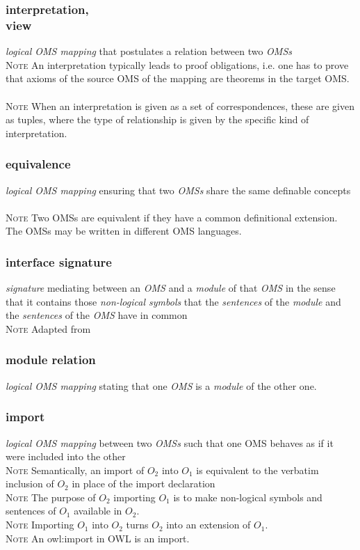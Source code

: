 \documentclass[10pt,%
\ifpretendfinal
final%
\else
draft%
\fi,
]{scrreprt}
\makeatletter
\newcommand*{\ie}{i.e.\@\xspace}
\newcommand*{\termref}[1]{\textit{#1}}
\newcommand*{\synonym}{,\\}
\newcommand{\termdefinition}[2]{\subsubsection*{\normalsize #1}#2}
\newenvironment{definitions}[0]{\medskip }{}
\newenvironment{note}[0]{\ \\ \textsc{Note} \quad}{}
\makeatother
\begin{document}
\begin{definitions}
  \termdefinition{interpretation\synonym view}{\termref{logical OMS mapping} that postulates a relation between two \termref{OMSs}}
  \begin{note}
    An interpretation typically leads to proof obligations, \ie one has to prove that axioms of the source OMS of the mapping are theorems in the target OMS.
  \end{note}
  \begin{note}
    When an interpretation is given as a set of correspondences, these are given as tuples, where the type of relationship is given by the specific kind of interpretation. 
  \end{note}

  \termdefinition{equivalence}
{\termref{logical OMS mapping} ensuring that two \termref{OMSs} share the
  same definable concepts}
  \begin{note}
    Two OMSs are equivalent if they have a common definitional extension.
    The OMSs may be written in different OMS languages.
  \end{note}

  \termdefinition{interface signature}{\termref{signature} mediating between an \termref{OMS} and a \termref{module} of that \termref{OMS} in the sense that it contains those \termref{non-logical symbols} that the \termref{sentences} of the \termref{module} and the \termref{sentences} of the \termref{OMS} have in common}
  \begin{note}
    Adapted from \cite{CuencaGrauEtAl:ExtractingModulesOntologies2007}
  \end{note}

  \termdefinition{module relation}{\termref{logical OMS mapping} stating that one \termref{OMS} is a \termref{module} of the other one.}

  \termdefinition{import}{\termref{logical OMS mapping} between two
    \termref{OMSs} such that one OMS behaves as if it were
    included into the other}
  \begin{note}
Semantically, an import of $O_2$ into $O_1$ is equivalent to the verbatim inclusion of $O_2$ in place of the import declaration
  \end{note}
  \begin{note}
    The purpose of $O_2$ importing $O_1$ is to make non-logical symbols and sentences of $O_1$ available in $O_2$.
  \end{note}
  \begin{note}
    Importing $O_1$ into $O_2$ turns $O_2$ into an extension of $O_1$.
  \end{note}
  \begin{note}
    An owl:import in OWL is an import.
  \end{note}
  

\end{definitions}
\end{document}
